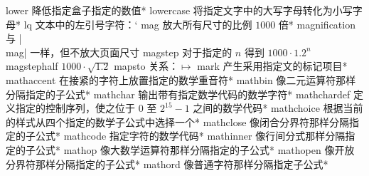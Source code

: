 \capcs lower {降低指定盒子指定的数值}*{}
\capcs lowercase {将指定文字中的大写字母转化为小写字母}*{}
\capcs lq {文本中的左引号字符：\lq}{}{}
\capcs mag {放大所有尺寸的比例 $1000$ 倍}*{}
\capcs magnification {与 |\\mag| 一样，但不放大页面尺寸}{}{}
\capcs magstep {对于指定的 $n$ 得到 $1000 \cdot 1.2^n$}{}{}
\capcs magstephalf {$1000\cdot\sqrt{1.2}$}{}{}
\capcs mapsto {关系：$\mapsto$}{}{}
\capcs mark {产生采用指定文的标记项目}*{}
\capcs mathaccent {在接紧的字符上放置指定的数学重音符}*{}
\capcs mathbin {像二元运算符那样分隔指定的子公式}*{}
\capcs mathchar {输出带有指定数学代码的数学字符}*{}
\capcs mathchardef {定义指定的控制序列，使之位于 0 至 $2^{15}-1$ 之间的数学代码}*{}
\capcs mathchoice {根据当前的样式从四个指定的数学子公式中选择一个}*{}
\capcs mathclose {像闭合分界符那样分隔指定的子公式}*{}
\capcs mathcode {指定字符的数学代码}*{}
\capcs mathinner {像行间分式那样分隔指定的子公式}*{}
\capcs mathop {像大数学运算符那样分隔指定的子公式}*{}
\capcs mathopen {像开放分界符那样分隔指定的子公式}*{}
\capcs mathord {像普通字符那样分隔指定子公式}*{}
